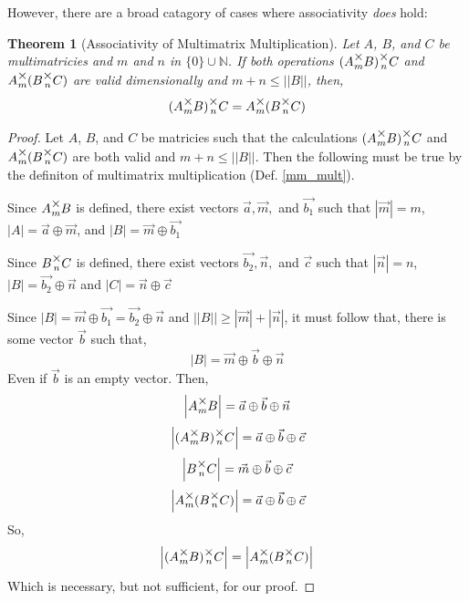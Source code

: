 \documentclass[12pt]{book}
\theoremstyle{plain}
\newtheorem{theorem}{Theorem}[chapter]
\theoremstyle{definition}
\theoremstyle{ppart}
\theoremstyle{case}
\theoremstyle{solution}
\newcommand{\mmult}[1]{\text{\raisebox{1ex}{$\underset{#1}{\times}$}}}
\newcommand{\shape}[1]{\left|#1\right|}
\begin{document}
However, there are a broad catagory of cases where associativity \textit{does} hold:

\begin{theorem}[Associativity of Multimatrix Multiplication]
\label{mm_associativity}
Let $A$, $B$, and $C$ be multimatricies and $m$ and $n$ in
$\{0\} \cup \mathbb{N}$.
If both operations $(A \mmult{m} B) \mmult{n} C$ and $A \mmult{m} (B \mmult{n} C)$
are valid dimensionally and $m+n \le \shape{\shape{B}}$, then,
\[ (A \mmult{m} B) \mmult{n} C = A \mmult{m} (B \mmult{n} C) \]
\end{theorem}
\begin{proof}
Let $A$, $B$, and $C$ be matricies such that the calculations
$(A \mmult{m} B) \mmult{n} C$ and $A \mmult{m} (B \mmult{n} C)$ are both valid
and $m + n \le \shape{\shape{B}}$.
Then the following must be true by the definiton of multimatrix multiplication
(Def. \ref{mm_mult}).

Since $A \mmult{m} B$ is defined, there exist vectors $\vec{a}, \vec{m},$ and
$\vec{b_1}$ such that 
$\shape{\vec{m}} = m$,
$\shape{A} = \vec{a} \oplus \vec{m}$,
and
$\shape{B} = \vec{m} \oplus \vec{b_1}$

Since $B \mmult{n} C$ is defined, there exist vectors $\vec{b_2}, \vec{n},$ and
$\vec{c}$ such that
$\shape{\vec{n}} = n$,
$\shape{B} = \vec{b_2} \oplus \vec{n}$
and
$\shape{C} = \vec{n} \oplus \vec{c}$

Since $\shape{B} = \vec{m} \oplus \vec{b_1} = \vec{b_2} \oplus \vec{n}$ and
$\shape{\shape{B}} \ge \shape{\vec{m}} + \shape{\vec{n}}$, it must follow that, there is some vector $\vec{b}$
such that,
\[
 \shape{B} = \vec{m} \oplus \vec{b} \oplus \vec{n}
\]
Even if $\vec{b}$ is an empty vector. Then,
\[ \shape{A \mmult{m} B} = \vec{a} \oplus \vec{b} \oplus \vec{n} \]
\[ \shape{(A \mmult{m} B) \mmult{n} C} = \vec{a} \oplus \vec{b} \oplus \vec{c} \]
\[ \shape{B \mmult{n} C} = \vec{m} \oplus \vec{b} \oplus \vec{c} \]
\[ \shape{A \mmult{m} (B \mmult{n} C)} = \vec{a} \oplus \vec{b} \oplus \vec{c} \]
So,
\[ \shape{(A \mmult{m} B) \mmult{n} C} = \shape{A \mmult{m} (B \mmult{n} C)} \]
Which is necessary, but not sufficient, for our proof.


\end{proof}
\end{document}
